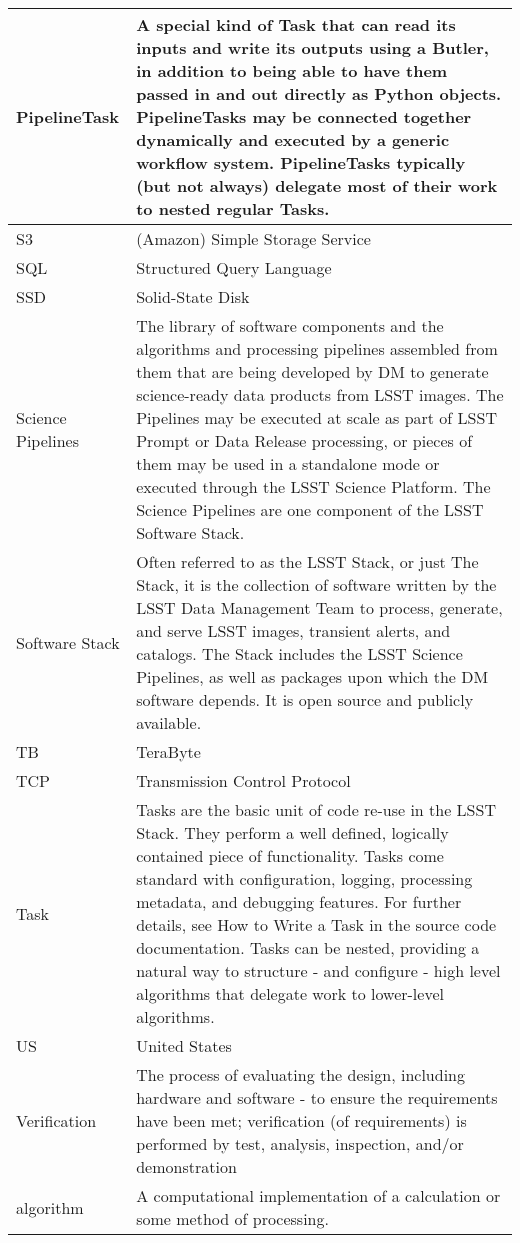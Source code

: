 \begin{longtable}{|p{}|p{}|}
PipelineTask & A special kind of Task that can read its inputs and write its outputs using a Butler, in addition to being able to have them passed in and out directly as Python objects. PipelineTasks may be connected together dynamically and executed by a generic workflow system. PipelineTasks typically (but not always) delegate most of their work to nested regular Tasks. \\\hline
S3 & (Amazon) Simple Storage Service  \\\hline
SQL & Structured Query Language \\\hline
SSD & Solid-State Disk \\\hline
Science Pipelines & The library of software components and the algorithms and processing pipelines assembled from them that are being developed by DM to generate science-ready data products from LSST images. The Pipelines may be executed at scale as part of LSST Prompt or Data Release processing, or pieces of them may be used in a standalone mode or executed through the LSST Science Platform. The Science Pipelines are one component of the LSST Software Stack. \\\hline
Software Stack & Often referred to as the LSST Stack, or just The Stack, it is the collection of software written by the LSST Data Management Team to process, generate, and serve LSST images, transient alerts, and catalogs. The Stack includes the LSST Science Pipelines, as well as packages upon which the DM software depends. It is open source and publicly available. \\\hline
TB & TeraByte \\\hline
TCP & Transmission Control Protocol \\\hline
Task & Tasks are the basic unit of code re-use in the LSST Stack. They perform a well defined, logically contained piece of functionality. Tasks come standard with configuration, logging, processing metadata, and debugging features. For further details, see How to Write a Task in the source code documentation.  Tasks can be nested, providing a natural way to structure - and configure - high level algorithms that delegate work to lower-level algorithms. \\\hline
US & United States \\\hline
Verification & The process of evaluating the design, including hardware and software - to ensure the requirements have been met;  verification (of requirements) is performed by test, analysis, inspection, and/or demonstration \\\hline
algorithm & A computational implementation of a calculation or some method of processing. \\\hline

\end{longtable}

